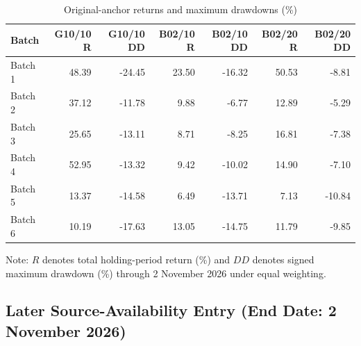 \documentclass[11pt,a4paper]{article}
\numberwithin{table}{section}
\begin{document}
\begin{minipage}{\linewidth}
\begin{center}\small\setlength{\tabcolsep}{3pt}\renewcommand{\arraystretch}{1.18}
\begin{longtable}{@{}lrrrrrr@{}}
\caption{Original-anchor returns and maximum drawdowns (\%)}\\
\toprule
Batch & G10/10 R & G10/10 DD & B02/10 R & B02/10 DD & B02/20 R & B02/20 DD\\\midrule\endhead
Batch 1 & 48.39 & -24.45 & 23.50 & -16.32 & 50.53 & -8.81\\
Batch 2 & 37.12 & -11.78 & 9.88 & -6.77 & 12.89 & -5.29\\
Batch 3 & 25.65 & -13.11 & 8.71 & -8.25 & 16.81 & -7.38\\
Batch 4 & 52.95 & -13.32 & 9.42 & -10.02 & 14.90 & -7.10\\
Batch 5 & 13.37 & -14.58 & 6.49 & -13.71 & 7.13 & -10.84\\
Batch 6 & 10.19 & -17.63 & 13.05 & -14.75 & 11.79 & -9.85\\
\bottomrule\end{longtable}\end{center}
\end{minipage}\par
Note: $R$ denotes total holding-period return (\%) and $DD$ denotes signed maximum drawdown (\%) through 2 November 2026 under equal weighting.

\subsection{Later Source-Availability Entry (End Date: 2 November 2026)}
\end{document}
